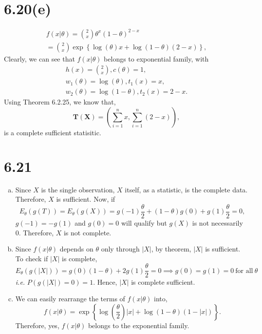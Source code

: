 \documentclass[letterpaper]{article}
\newcommand{\TX}{\mathbf{T(X)}}
\begin{document}
    \section*{6.20(e)}
    \begin{eqnarray*}
    f(x|\theta) = \binom{2}{x} \theta^x (1-\theta)^{2-x} \\
    = \binom{2}{x} \exp\left\{\log(\theta) x + \log(1-\theta) (2-x) \right\},
    \end{eqnarray*}
    Clearly, we can see that $f(x|\theta)$ belongs to exponential family, with 
    \begin{eqnarray*} 
    h(x) = \binom{2}{x}, c(\theta) = 1, \\
    w_1(\theta) = \log(\theta), t_1(x) = x, \\
    w_2(\theta) = \log(1-\theta), t_2(x) = 2-x.
    \end{eqnarray*}
    Using Theorem 6.2.25, we know that,
    \[
    \TX = \left(\sum_{i=1}^n x, \sum_{i=1}^n (2-x)\right),
    \]
    is a complete sufficient statisitic.

    \section*{6.21}
    \begin{enumerate}[(a)]
    \item Since $X$ is the single observation, $X$ itself, as a statistic, is the complete data. Therefore, $X$ is sufficient.
    Now, if
    \[
    E_\theta(g(T)) = E_\theta(g(X)) = g(-1) \frac{\theta}{2} + (1-\theta) g(0) + g(1) \frac{\theta}{2} = 0,
    \]
    $g(-1) = -g(1)$ and $g(0) = 0$ will qualify but $g(X)$ is not necessarily 0. Therefore, $X$ is not complete.

    \item Since $f(x|\theta)$ depends on $\theta$ only through $|X|$, by theorem, $|X|$ is sufficient.
    To check if $|X|$ is complete, 
    \[
    E_\theta(g(|X|)) = g(0) (1-\theta) + 2 g(1) \frac{\theta}{2} = 0 \implies g(0) = g(1) = 0 ~\text{for all}~ \theta
    \]
    \emph{i.e.} $P(g(|X|) = 0) = 1$. Hence, $|X|$ is complete sufficient.

    \item We can easily rearrange the terms of $f(x|\theta)$ into,
    \[
    f(x|\theta) = \exp\left\{\log\left(\frac{\theta}{2}\right) |x| + \log(1-\theta) (1-|x|)\right\}.
    \]
    Therefore, yes, $f(x|\theta)$ belongs to the exponential family.
    \end{enumerate}
\end{document}
